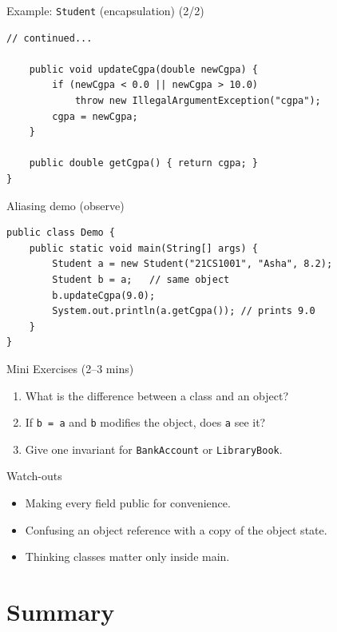 \documentclass{beamer}
\begin{document}
\begin{frame}[fragile]{Example: \texttt{Student} (encapsulation) (2/2)}
\begin{lstlisting}
// continued...

    public void updateCgpa(double newCgpa) {
        if (newCgpa < 0.0 || newCgpa > 10.0)
            throw new IllegalArgumentException("cgpa");
        cgpa = newCgpa;
    }

    public double getCgpa() { return cgpa; }
}
\end{lstlisting}
  \slidesources{\OOPSUnitIISources}
\end{frame}

\begin{frame}[fragile]{Aliasing demo (observe)}
\begin{lstlisting}
public class Demo {
    public static void main(String[] args) {
        Student a = new Student("21CS1001", "Asha", 8.2);
        Student b = a;   // same object
        b.updateCgpa(9.0);
        System.out.println(a.getCgpa()); // prints 9.0
    }
}
\end{lstlisting}
  \slidesources{\OOPSUnitIISources}
\end{frame}

\begin{frame}{Mini Exercises (2--3 mins)}
  \begin{enumerate}[<+->]
    \item What is the difference between a class and an object?
    \item If \texttt{b = a} and \texttt{b} modifies the object, does \texttt{a} see it?
    \item Give one invariant for \texttt{BankAccount} or \texttt{LibraryBook}.
  \end{enumerate}
  \slidesources{\OOPSUnitIISources}
\end{frame}

\begin{frame}{Watch-outs}
\begin{itemize}[<+->]
  \item Making every field public for convenience.
  \item Confusing an object reference with a copy of the object state.
  \item Thinking classes matter only inside main.
\end{itemize}
  \slidesources{\OOPSUnitIISources}
\end{frame}

\section{Summary}
\label{sec:summary}
\end{document}

